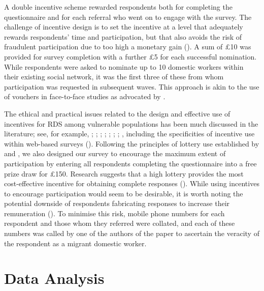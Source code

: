 \documentclass[
  12pt,
  letterpaper,
  DIV=11,
  numbers=noendperiod]{scrartcl}
\theoremstyle{plain}
\theoremstyle{definition}
\begin{document}
A double incentive scheme rewarded respondents both for completing the
questionnaire and for each referral who went on to engage with the
survey. The challenge of incentive design is to set the incentive at a
level that adequately rewards respondents' time and participation, but
that also avoids the risk of fraudulent participation due to too high a
monetary gain (\textcite{jordan_overcoming_2020}). A sum of £10 was
provided for survey completion with a further £5 for each successful
nomination. While respondents were asked to nominate up to 10 domestic
workers within their existing social network, it was the first three of
these from whom participation was requested in subsequent waves. This
approach is akin to the use of vouchers in face-to-face studies as
advocated by \textcite{thompson_new_2020}.

The ethical and practical issues related to the design and effective use
of incentives for RDS among vulnerable populations has been much
discussed in the literature; see, for example,
\textcite{wang_respondent-driven_2005};
\textcite{abdul-quader_effectiveness_2006};
\textcite{singer_incentives_2006}; \textcite{dejong_ethical_2009};
\textcite{semaan_ethical_2009}; \textcite{brunovskis_untold_2010};
\textcite{semaan_time-space_2010}; \textcite{platt_adapting_2015},
including the specificities of incentive use within web-based surveys
(\textcite{cobanoglu_effect_2003}). Following the principles of lottery
use established by \textcite{brown_you_2006} and
\textcite{laguilles_can_2011}, we also designed our survey to encourage
the maximum extent of participation by entering all respondents
completing the questionnaire into a free prize draw for £150. Research
suggests that a high lottery provides the most cost-effective incentive
for obtaining complete responses
(\textcite{gajic_cost-effectiveness_2012}). While using incentives to
encourage participation would seem to be desirable, it is worth noting
the potential downside of respondents fabricating responses to increase
their remuneration (\textcite{robinson_sampling_2014}). To minimise this
risk, mobile phone numbers for each respondent and those whom they
referred were collated, and each of these numbers was called by one of
the authors of the paper to ascertain the veracity of the respondent as
a migrant domestic worker.

\section{Data Analysis}\label{data-analysis}
\end{document}
